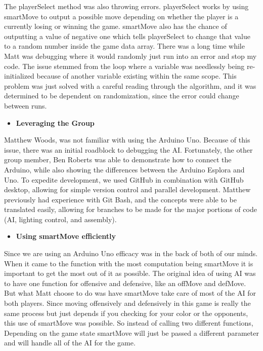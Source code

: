 \documentclass[twoside]{article}
\begin{document}
\text The playerSelect method was also throwing errors. playerSelect works by using smartMove to output a possible move depending on whether the player is a currently losing or winning the game. smartMove also has the chance of outputting a value of negative one which tells playerSelect to change that value to a random number inside the game data array. There was a long time while Matt was debugging where it would randomly just run into an error and stop my code. The issue stemmed from the loop where a variable was needlessly being re-initialized because of another variable existing within the same scope. This problem was just solved with a careful reading through the algorithm, and it was determined to be dependent on randomization, since the error could change between runs.
\begin{itemize}
    \item\textbf{Leveraging the Group}
\end{itemize}
\text Matthew Woods, was not familiar with using the Arduino Uno. Because of this issue, there was an initial roadblock to debugging the AI. Fortunately, the other group member, Ben Roberts was able to demonstrate how to connect the Arduino, while also showing the differences between the Arduino Esplora and Uno. To expedite development, we used GitHub in combination with GitHub desktop, allowing for simple version control and parallel development. Matthew previously had experience with Git Bash, and the concepts were able to be translated easily, allowing for branches to be made for the major portions of code (AI, lighting control, and assembly).
\begin{itemize}
    \item\textbf{Using smartMove efficiently} 
\end{itemize}
Since we are using an Arduino Uno efficacy was in the back of both of our minds. When it came to the function with the most computation being smartMove it is important to get the most out of it as possible. The original idea of using AI was to have one function for offensive and defensive, like an offMove and defMove. But what Matt choose to do was have smartMove take care of most of the AI for both players. Since moving offensively and defensively in this game is really the same process but just depends if you checking for your color or the opponents, this use of smartMove was possible. So instead of calling two different functions, Depending on the game state smartMove will just be passed a different parameter and will handle all of the AI for the game.   
\end{document}
